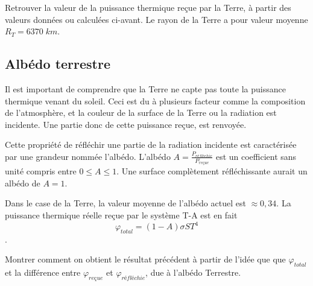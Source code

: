 \documentclass[11pt,a4paper]{article}
\begin{document}
\begin{exo}
Retrouver la valeur de la puissance thermique reçue par la Terre, à partir des valeurs données ou calculées ci-avant. Le rayon de la Terre a pour valeur moyenne $R_T=6370\; km$.
\vspace{7cm}
\end{exo}

\subsection{Albédo terrestre}
Il est important de comprendre que la Terre ne capte pas toute la puissance thermique venant du soleil. Ceci est du à plusieurs facteur comme la composition de l'atmosphère, et la couleur de la surface de la Terre ou la radiation est incidente. Une partie donc de cette puissance reçue, est renvoyée. 

Cette propriété de réfléchir une partie de la radiation incidente est caractérisée par une grandeur nommée l'albédo. L'albédo $A=\frac{P_{réfléchie}}{P_{reçue}}$ est un coefficient sans unité compris entre $0\leq A\leq 1$. Une surface complètement réfléchissante aurait un albédo de $A=1$. 

Dans le case de la Terre, la valeur moyenne de l'albédo actuel est $\approx0,34$. La puissance thermique réelle reçue par le système T-A est en fait \[  \varphi_{total} =\left(1-A\right)\sigma S T^4 \]. 

\begin{exo}
Montrer comment on obtient le résultat précédent à partir de l'idée que que $\varphi_{total}$ et la différence entre $\varphi_{reçue}$ et $\varphi_{réfléchie}$, due à l'albédo Terrestre. 
\vspace{4.5cm}
\end{exo}
\end{document}
